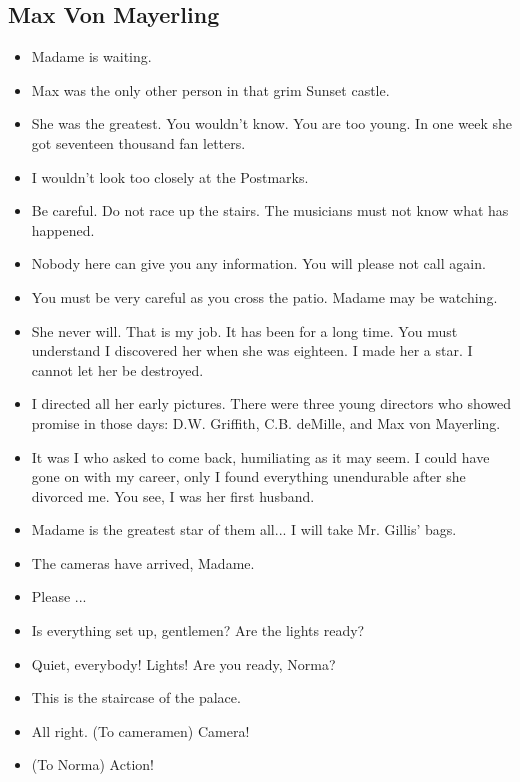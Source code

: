 \documentclass[a4paper]{article}
\begin{document}
\subsection{Max Von Mayerling}
\begin{itemize}
\item Madame is waiting.
\item Max was the only other person in that grim Sunset castle.
\item She was the greatest. You wouldn't know. You are too young. In one week she got seventeen thousand fan letters.
\item I wouldn't look too closely at the Postmarks.
\item Be careful. Do not race up the stairs. The musicians must not know what has happened.
\item Nobody here can give you any information. You will please not call again.
\item You must be very careful as you cross the patio. Madame may be watching.
\item She never will. That is my job. It has been for a long time. You must understand I discovered her when she was eighteen. I made her a star. I cannot let her be destroyed.
\item I directed all her early pictures. There were three young directors who showed promise in those days: D.W. Griffith, C.B. deMille, and Max von Mayerling.
\item It was I who asked to come back, humiliating as it may seem. I could have gone on with my career, only I found everything unendurable after she divorced me. You see, I was her first husband.
\item Madame is the greatest star of them all... I will take Mr. Gillis' bags.
\item The cameras have arrived, Madame.
\item Please ...
\item Is everything set up, gentlemen? Are the lights ready?
\item Quiet, everybody! Lights! Are you ready, Norma?
\item This is the staircase of the palace.
\item All right. (To cameramen) Camera!
\item (To Norma) Action!
\end{itemize}
\end{document}

